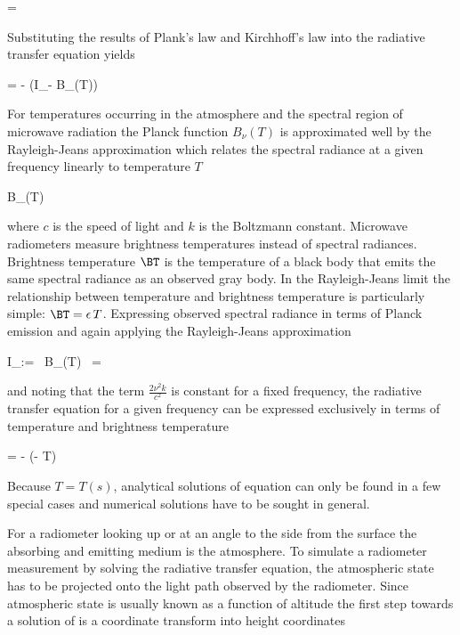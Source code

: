      \le \ABSCOEF = \epsilon {}
    \stopformula

    Substituting the results of Plank's law and Kirchhoff's law into the
    radiative transfer equation  yields

    \startformula
         = - \ABSCOEF(I_\nu - B_\nu(T)) \EQSTOP
    \stopformula

    For temperatures occurring in the atmosphere and the spectral region of
    microwave radiation the Planck function $B_\nu (T)$ is approximated
    well by the Rayleigh-Jeans approximation which relates the spectral
    radiance at a given frequency linearly to temperature $T$

    \startformula
        B_\nu(T) \approx {}
    \stopformula

    where $c$ is the speed of light and $k$ is the Boltzmann constant.
    Microwave radiometers measure brightness temperatures instead of spectral
    radiances. Brightness temperature $\BT$ is the temperature of a black body
    that emits the same spectral radiance as an observed gray body. In the
    Rayleigh-Jeans limit the relationship between temperature and brightness
    temperature is particularly simple: $\BT = \epsilon \, T$. Expressing
    observed spectral radiance in terms of Planck emission and again
    applying the Rayleigh-Jeans approximation

    \startformula
        I_\nu := \epsilon \, B_\nu(T)
            \approx \epsilon \, 
            =  \, \BT \EQCOMMA
    \stopformula

    and noting that the term $\frac{2 \nu^2 k}{c^2}$ is constant for a
    fixed frequency, the radiative transfer equation  for
    a given frequency can be expressed exclusively in terms of temperature and
    brightness temperature

    \startformula
         = - \ABSCOEF (\BT - T) \EQSTOP
    \stopformula

    Because $T = T(s)$, analytical solutions of equation 
    can only be found in a few special cases and numerical solutions have to
    be sought in general.

\stopsection


\startsection[title={A Solution for Ground-based Radiometer Applications}]

    For a radiometer looking up or at an angle to the side from the surface the
    absorbing and emitting medium is the atmosphere. To simulate a radiometer
    measurement by solving the radiative transfer equation, the atmospheric
    state has to be projected onto the light path observed by the radiometer.
    Since atmospheric state is usually known as a function of altitude the
    first step towards a solution of  is a coordinate
    transform into height coordinates

